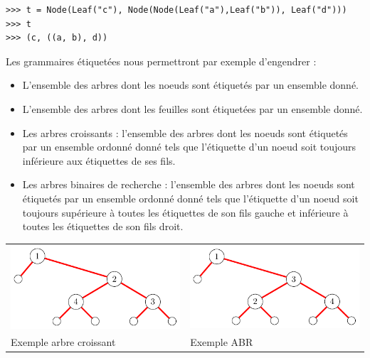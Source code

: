 \documentclass[11pt]{article}
\begin{document}
\begin{verbatim}
>>> t = Node(Leaf("c"), Node(Node(Leaf("a"),Leaf("b")), Leaf("d")))
>>> t
>>> (c, ((a, b), d))
\end{verbatim}

Les grammaires étiquetées nous permettront par exemple d'engendrer :

\begin{itemize}
\item L'ensemble des arbres dont les noeuds sont étiquetés par un ensemble donné.
\item L'ensemble des arbres dont les feuilles sont étiquetées par un ensemble donné.
\item Les arbres croissants : l'ensemble des arbres dont les noeuds sont étiquetés par 
un ensemble ordonné donné tels que l'étiquette d'un noeud soit toujours inférieure 
aux étiquettes de ses fils.
\item Les arbres binaires de recherche : l'ensemble des arbres dont les noeuds sont étiquetés par 
un ensemble ordonné donné tels que l'étiquette d'un noeud soit toujours supérieure
à toutes les étiquettes de son fils gauche et inférieure à toutes les étiquettes
de son fils droit.
\end{itemize}

\begin{tabular}{l|l}
\includegraphics[scale=.5]{images/arbre_croissant.pdf} & 
\includegraphics[scale=.5]{images/abr.pdf} \\
Exemple arbre croissant & Exemple ABR
\end{tabular}
\end{document}
